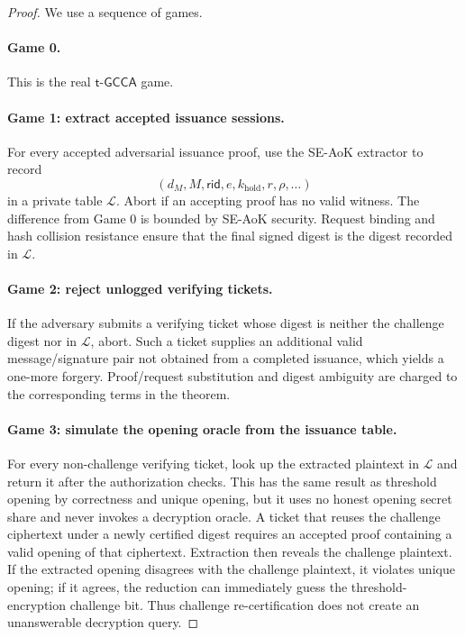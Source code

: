 \documentclass[11pt]{article}
\newcommand{\rid}{\mathsf{rid}}
\begin{document}
\begin{proof}
We use a sequence of games.

\paragraph{Game 0.}
This is the real $\mathsf{t\text{-}GCCA}$ game.

\paragraph{Game 1: extract accepted issuance sessions.}
For every accepted adversarial issuance proof, use the SE-AoK extractor to
record
\[
  (d_M,M,\rid,e,k_{\mathrm{hold}},r,\rho,\ldots)
\]
in a private table $\mathcal L$.  Abort if an accepting proof has no valid
witness.  The difference from Game 0 is bounded by SE-AoK security.  Request
binding and hash collision resistance ensure that the final signed digest is
the digest recorded in $\mathcal L$.

\paragraph{Game 2: reject unlogged verifying tickets.}
If the adversary submits a verifying ticket whose digest is neither the
challenge digest nor in $\mathcal L$, abort.  Such a ticket supplies an
additional valid message/signature pair not obtained from a completed issuance,
which yields a one-more forgery.  Proof/request substitution and digest
ambiguity are charged to the corresponding terms in the theorem.

\paragraph{Game 3: simulate the opening oracle from the issuance table.}
For every non-challenge verifying ticket, look up the extracted plaintext in
$\mathcal L$ and return it after the authorization checks.  This has the same
result as threshold opening by correctness and unique opening, but it uses no
honest opening secret share and never invokes a decryption oracle.  A ticket
that reuses the challenge ciphertext under a newly certified digest requires an
accepted proof containing a valid opening of that ciphertext.  Extraction then
reveals the challenge plaintext.  If the extracted opening disagrees with the
challenge plaintext, it violates unique opening; if it agrees, the reduction
can immediately guess the threshold-encryption challenge bit.  Thus challenge
re-certification does not create an unanswerable decryption query.


\end{proof}
\end{document}
